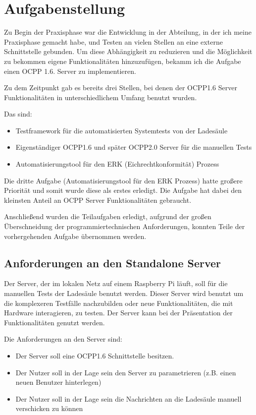 \section{Aufgabenstellung}
Zu Begin der Praxisphase war die Entwicklung in der Abteilung, in der ich meine Praxisphase gemacht habe, und Testen an vielen Stellen an eine externe Schnittstelle gebunden.
Um diese Abhängigkeit zu reduzieren und die Möglichkeit zu bekommen eigene Funktionalitäten hinzuzufügen, bekamm ich die Aufgabe
einen OCPP 1.6. Server zu implementieren.

Zu dem Zeitpunkt gab es bereits drei Stellen, bei denen der OCPP1.6 Server Funktionalitäten in unterschiedlichem Umfang benutzt wurden.

Das sind:
\begin{itemize}
    \item Testframework für die automatisierten Systemtests von der Ladesäule
    \item Eigenständiger OCPP1.6 und später OCPP2.0 Server für die manuellen Tests
    \item Automatisierungstool für den ERK (Eichrechtkonformität) Prozess
\end{itemize}

Die dritte Aufgabe (Automatisierungstool für den ERK Prozess) hatte großere Priorität und somit wurde diese als erstes erledigt.
Die Aufgabe hat dabei den kleinsten Anteil an OCPP Server Funktionalitäten gebraucht.

Anschließend wurden die Teilaufgaben erledigt, aufgrund der großen Überschneidung der programmiertechnischen Anforderungen, 
konnten Teile der vorhergehenden Aufgabe übernommen werden.


\subsection{Anforderungen an den Standalone Server}
    Der Server, der im lokalen Netz auf einem Raspberry Pi läuft, soll für die manuellen Tests der Ladesäule benutzt werden.
    Dieser Server wird benutzt um die komplexeren Testfälle nachzubilden oder neue Funktionalitäten, die mit Hardware interagieren, zu testen.
    Der Server kann bei der Präsentation der Funktionalitäten genutzt werden.

    Die Anforderungen an den Server sind:
    \begin{itemize}
        \item Der Server soll eine OCPP1.6 Schnittstelle besitzen.
        \item Der Nutzer soll in der Lage sein den Server zu parametrieren (z.B. einen neuen Benutzer hinterlegen)
        \item Der Nutzer soll in der Lage sein die Nachrichten an die Ladesäule manuell verschicken zu können
    \end{itemize}

